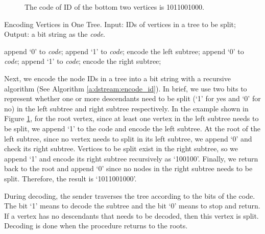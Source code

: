     \begin{figure}
    \centering
    \caption{The code of ID of the bottom two
    vertices is 1011001000. 
    \label{f:dstream:encode_id}}
    \end{figure}
    \begin{algorithm}
    \caption[Encoding Vertices in One Tree.]{Encoding Vertices in One Tree.
    Input: IDs of vertices in a tree to be split;
    Output: a bit string as the \emph{code}.\label{a:dstream:encode_id}}
    \begin{algorithmic}
        \STATE append `0' to \emph{code};
    \ELSE
        \STATE append `1' to \emph{code};
        \STATE encode the left subtree;
    \ENDIF
        \STATE append `0' to \emph{code};
    \ELSE
        \STATE append `1' to \emph{code};
        \STATE encode the right subtree;
    \ENDIF
    \end{algorithmic}
    \end{algorithm}
    Next, we encode the node IDs in a tree into a bit string with 
    a recursive algorithm (See Algorithm \ref{a:dstream:encode_id}).
    In brief, we use two bits to represent whether one or more descendants need
    to be split (`1' for yes and `0' for no)
    in the left subtree and right subtree respectively. 
    In the example shown in Figure \ref{f:dstream:encode_id}, for the root vertex, since at least one vertex
    in the left subtree needs to be split, we append `1' to the code and encode the
    left subtree. At the root of the left subtree, since no vertex needs to split in its left
    subtree, we append `0' and check its right subtree. Vertices to be split exist in the right
    subtree, so we append `1' and encode its right subtree recursively as `100100'. 
    Finally, we return back to the root and append `0' since 
    no nodes in the right subtree needs to be split. 
    Therefore, the result is `1011001000'.
        
    During decoding, the sender traverses the tree according to the bits of the code. 
    The bit `1' means to decode the subtree and the bit `0' means to stop and return.
    If a vertex has no descendants that needs to be decoded, then this vertex is split. 
    Decoding is done when the procedure returns to the roots.
    
